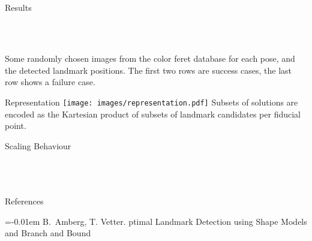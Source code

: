 \documentclass[portrait,final,a0paper,fontscale=0.277]{baposter}
\begin{document}
\begin{poster}
\begin{posterbox}[name=results,column=1,span=2,row=0]{Results}
{\begin{tabular}{@{}rccccccc@{}}
\end{tabular}
  }\\[-1em]
      \begin{multicols}{2}
Some randomly chosen images from the color feret database for each
pose, and the detected landmark positions. The first two rows are success
cases, the last row shows a failure case. 
      \end{multicols}
\end{posterbox}
  \begin{posterbox}[name=representation,column=2,below=results]{Representation}
\centering\texttt{[image: images/representation.pdf]}
Subsets of solutions are encoded as the Kartesian product of subsets of landmark candidates per fiducial point. 
  \end{posterbox}
\begin{posterbox}[name=scaling,column=2,below=representation]{Scaling Behaviour}%
  \smaller%
  \\[0em]%
  \\[0em]%
  \\[0em]%
  \\[0em]%
\end{posterbox}
  \begin{posterbox}[name=references,column=0,above=bottom]{References}
    \smaller
    
    \renewcommand{\section}[2]{\vskip 0.05em}
      \begin{thebibliography}{1}\itemsep=-0.01em
      \setlength{\baselineskip}{0.4em}
        B.~Amberg, T. Vetter.
        ptimal {L}andmark {D}etection using {S}hape {M}odels and {B}ranch and {B}ound

\end{thebibliography}
\end{posterbox}
\end{poster}
\end{document}
